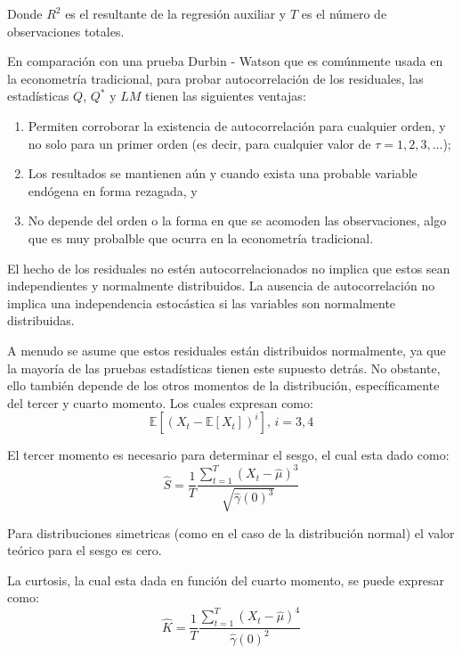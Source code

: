 \documentclass[
]{book}
\begin{document}
Donde \(R^2\) es el resultante de la regresión auxiliar y \(T\) es el número de observaciones totales.

En comparación con una prueba Durbin - Watson que es comúnmente usada en la econometría tradicional, para probar autocorrelación de los residuales, las estadísticas \(Q\), \(Q^*\) y \(LM\) tienen las siguientes ventajas:

\begin{enumerate}
\def\labelenumi{\arabic{enumi}.}
\item
  Permiten corroborar la existencia de autocorrelación para cualquier orden, y no solo para un primer orden (es decir, para cualquier valor de \(\tau = 1, 2, 3, \ldots\));
\item
  Los resultados se mantienen aún y cuando exista una probable variable endógena en forma rezagada, y
\item
  No depende del orden o la forma en que se acomoden las observaciones, algo que es muy probalble que ocurra en la econometría tradicional.
\end{enumerate}

El hecho de los residuales no estén autocorrelacionados no implica que estos sean independientes y normalmente distribuidos. La ausencia de autocorrelación no implica una independencia estocástica si las variables son normalmente distribuidas.

A menudo se asume que estos residuales están distribuidos normalmente, ya que la mayoría de las pruebas estadísticas tienen este supuesto detrás. No obstante, ello también depende de los otros momentos de la distribución, específicamente del tercer y cuarto momento. Los cuales expresan como:
\begin{equation*}
    \mathbb{E}[(X_t - \mathbb{E}[X_t])^i] \mbox{, } i = 3, 4
\end{equation*}

El tercer momento es necesario para determinar el sesgo, el cual esta dado como:
\begin{equation}
    \hat{S} = \frac{1}{T} \frac{\sum_{t = 1}^{T} (X_t - \hat{\mu})^3}{\sqrt{\hat{\gamma}(0)^3}}
    \label{eq:eqautocorr6}
\end{equation}

Para distribuciones simetricas (como en el caso de la distribución normal) el valor teórico para el sesgo es cero.

La curtosis, la cual esta dada en función del cuarto momento, se puede expresar como:
\begin{equation}
    \hat{K} = \frac{1}{T} \frac{\sum_{t = 1}^{T} (X_t - \hat{\mu})^4}{\hat{\gamma}(0)^2}
    \label{eq:eqautocorr7}
\end{equation}
\end{document}

